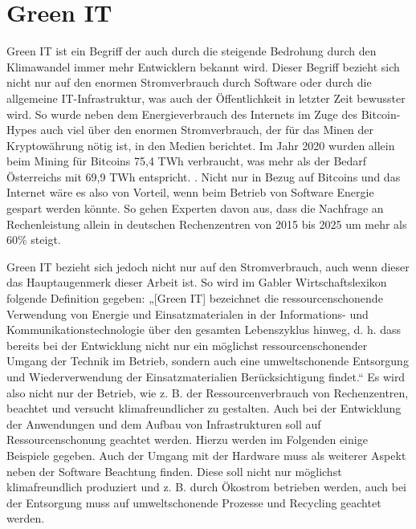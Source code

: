 \documentclass[utf8,biblatex]{lni}
\begin{document}
\section{Green IT}
\label{GreenIT}
Green IT ist ein Begriff der auch durch die steigende Bedrohung durch den Klimawandel immer mehr Entwicklern bekannt wird. Dieser Begriff bezieht sich nicht nur auf den enormen Stromverbrauch durch Software oder durch die allgemeine IT-Infrastruktur, was auch der Öffentlichkeit in letzter Zeit bewusster wird. So wurde neben dem Energieverbrauch des Internets im Zuge des Bitcoin-Hypes auch viel über den enormen Stromverbrauch, der für das Minen der Kryptowährung nötig ist, in den Medien berichtet. Im Jahr 2020 wurden allein beim Mining für Bitcoins 75,4 TWh verbraucht, was mehr als der Bedarf Österreichs mit 69,9 TWh entspricht. \cite{ZDF22}. Nicht nur in Bezug auf Bitcoins und das Internet wäre es also von Vorteil, wenn beim Betrieb von Software Energie gespart werden könnte. So gehen Experten davon aus, dass die Nachfrage an Rechenleistung allein in deutschen Rechenzentren von 2015 bis 2025 um mehr als 60\% steigt. \cite{BMUV20}

Green IT bezieht sich jedoch nicht nur auf den Stromverbrauch, auch wenn dieser das Hauptaugenmerk dieser Arbeit ist. So wird im Gabler Wirtschaftslexikon folgende Definition gegeben: „[Green IT] bezeichnet die ressourcenschonende Verwendung von Energie und Einsatzmaterialen in der Informations- und Kommunikationstechnologie über den gesamten Lebenszyklus hinweg, d. h. dass bereits bei der Entwicklung nicht nur ein möglichst ressourcenschonender Umgang der Technik im Betrieb, sondern auch eine umweltschonende Entsorgung und Wiederverwendung der Einsatzmaterialien Berücksichtigung findet.“ \cite{Lackes18} Es wird also nicht nur der Betrieb, wie z. B. der Ressourcenverbrauch von Rechenzentren, beachtet und versucht klimafreundlicher zu gestalten. Auch bei der Entwicklung der Anwendungen und dem Aufbau von Infrastrukturen soll auf Ressourcenschonung geachtet werden. Hierzu werden im Folgenden einige Beispiele gegeben. Auch der Umgang mit der Hardware muss als weiterer Aspekt neben der Software Beachtung finden. Diese soll nicht nur möglichst klimafreundlich produziert und z. B. durch Ökostrom betrieben werden, auch bei der Entsorgung muss auf umweltschonende Prozesse und Recycling geachtet werden.
\end{document}
